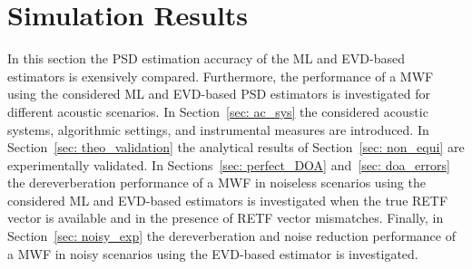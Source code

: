 \documentclass[10pt]{IEEEtran}
\begin{document}
\section{Simulation Results}
\label{sec: sims}
In this section the PSD estimation accuracy of the ML and EVD-based estimators is exensively compared.
Furthermore, the performance of a MWF using the considered ML and EVD-based PSD estimators is investigated for different acoustic scenarios.
In Section~\ref{sec: ac_sys} the considered acoustic systems, algorithmic settings, and instrumental measures are introduced.
In Section~\ref{sec: theo_validation} the analytical results of Section~\ref{sec: non_equi} are experimentally validated.
In Sections~\ref{sec: perfect_DOA} and~\ref{sec: doa_errors} the dereverberation performance of a MWF in noiseless scenarios using the considered ML and EVD-based estimators is investigated when the true RETF vector is available and in the presence of RETF vector mismatches.
Finally, in Section~\ref{sec: noisy_exp} the dereverberation and noise reduction performance of a MWF in noisy scenarios using the EVD-based estimator is investigated.
\end{document}
